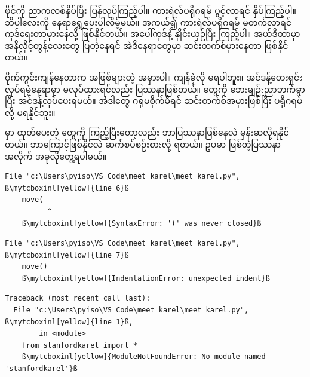  ဖိုင်ကို ညာကလစ်နှိပ်ပြီး  ပြန်လုပ်ကြည့်ပါ။ ကားရဲလ်ပရိုဂရမ် ပွင့်လာရင်  နှိပ်ကြည့်ပါ။ ဘိပါလေးကို နေရာရွှေ့ပေးပါလိမ့်မယ်။ အကယ်၍ ကားရဲလ်ပရိုဂရမ် မတက်လာရင် ကုဒ်ရေးတာမှားနေလို့ ဖြစ်နိုင်တယ်။ အပေါ်ကုဒ်နဲ့ နှိုင်းယှဉ်ပြီး ကြည့်ပါ။  အယ်ဒီတာမှာ အနီလှိုင့်တွန့်လေးတွေ ပြတဲ့နေရင် အဲဒီနေရာတွေမှာ ဆင်းတက်စ်မှားနေတာ ဖြစ်နိုင်တယ်။

ဝိုက်ကွင်းကျန်နေတာက အဖြစ်များတဲ့ အမှားပါ။ ကျန်ခဲ့လို မရပါဘူး။ အင်ဒန့်တေးရှင်း  လုပ်ရမဲ့နေရာမှာ မလုပ်ထားရင်လည်း ပြဿနာဖြစ်တယ်။ \fEn{,}  တွေကို ဘေးမျဉ်းညာဘက်ခွာပြီး အင်ဒန့်လုပ်ပေးရမယ်။ အဲဒါတွေ ဂရုမစိုက်မိရင် ဆင်းတက်စ်အမှားဖြစ်ပြီး ပရိုဂရမ်  လို့ မရနိုင်ဘူး။

 မှာ ထုတ်ပေးတဲ့ တွေကို ကြည့်ပြီးတော့လည်း ဘာပြဿနာဖြစ်နေလဲ မှန်းဆလို့ရနိုင်တယ်။ ဘာကြောင့်ဖြစ်နိုင်လဲ ဆက်စပ်စဉ်းစားလို့ ရတယ်။ ဥပမာ ဖြစ်တဲ့ပြဿနာအလိုက် အခုလိုတွေ့ရပါမယ်။ 
%
\begin{verbatim}
File "c:\Users\pyiso\VS Code\meet_karel\meet_karel.py", ß\mytcboxinl[yellow]{line 6}ß
    move(
          ^
    ß\mytcboxinl[yellow]{SyntaxError: '(' was never closed}ß
\end{verbatim}
%
%
\begin{verbatim}
File "c:\Users\pyiso\VS Code\meet_karel\meet_karel.py", ß\mytcboxinl[yellow]{line 7}ß
    move()
    ß\mytcboxinl[yellow]{IndentationError: unexpected indent}ß 
\end{verbatim}
%
%
\begin{verbatim}
Traceback (most recent call last):
  File "c:\Users\pyiso\VS Code\meet_karel\meet_karel.py", ß\mytcboxinl[yellow]{line 1}ß, 
        in <module>
    from stanfordkarel import *
    ß\mytcboxinl[yellow]{ModuleNotFoundError: No module named 'stanfordkarel'}ß
\end{verbatim}
%



\afterpage{\blankpage}











